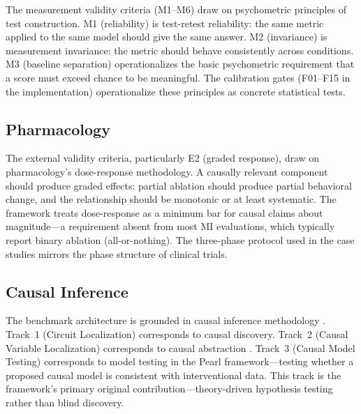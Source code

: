 \documentclass[10pt]{article}
\begin{document}
The measurement validity criteria (M1--M6) draw on psychometric principles of test construction. M1 (reliability) is test-retest reliability: the same metric applied to the same model should give the same answer. M2 (invariance) is measurement invariance: the metric should behave consistently across conditions. M3 (baseline separation) operationalizes the basic psychometric requirement that a score must exceed chance to be meaningful. The calibration gates (F01--F15 in the implementation) operationalize these principles as concrete statistical tests.

\subsection{Pharmacology}

The external validity criteria, particularly E2 (graded response), draw on pharmacology's dose-response methodology. A causally relevant component should produce graded effects: partial ablation should produce partial behavioral change, and the relationship should be monotonic or at least systematic. The framework treats dose-response as a minimum bar for causal claims about magnitude---a requirement absent from most MI evaluations, which typically report binary ablation (all-or-nothing). The three-phase protocol used in the case studies mirrors the phase structure of clinical trials.

\subsection{Causal Inference}

The benchmark architecture is grounded in causal inference methodology \citep{pearl2009causality, spirtes2000causation}. Track~1 (Circuit Localization) corresponds to causal discovery. Track~2 (Causal Variable Localization) corresponds to causal abstraction \citep{geiger2023causal}. Track~3 (Causal Model Testing) corresponds to model testing in the Pearl framework---testing whether a proposed causal model is consistent with interventional data. This track is the framework's primary original contribution---theory-driven hypothesis testing rather than blind discovery.
\end{document}
